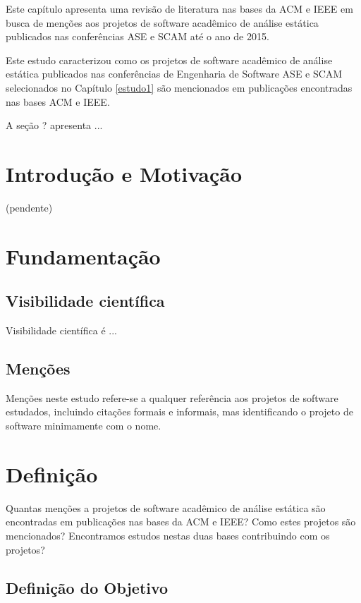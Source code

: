 {Este capítulo apresenta uma revisão de literatura nas bases da ACM e IEEE em
busca de menções aos projetos de software acadêmico de análise estática
publicados nas conferências ASE e SCAM até o ano de 2015.}

Este estudo caracterizou como os projetos de software acadêmico de análise
estática publicados nas conferências de Engenharia de Software ASE e SCAM
selecionados no Capítulo \ref{estudo1} são mencionados em publicações
encontradas nas bases ACM e IEEE.

A seção ? apresenta ...

\section{Introdução e Motivação}

(pendente)

\section{Fundamentação} \label{estudo2:fundamentacao} %

\subsection{Visibilidade científica}

Visibilidade científica é ...

\subsection{Menções}

Menções neste estudo refere-se a qualquer referência aos projetos de software
estudados, incluindo citações formais e informais, mas identificando o projeto
de software minimamente com o nome.


\section{Definição} \label{estudo2:definicao} %

Quantas menções a projetos de software acadêmico de análise estática são
encontradas em publicações nas bases da ACM e IEEE? Como estes projetos são
mencionados? Encontramos estudos nestas duas bases contribuindo com os
projetos?

\subsection{Definição do Objetivo}

